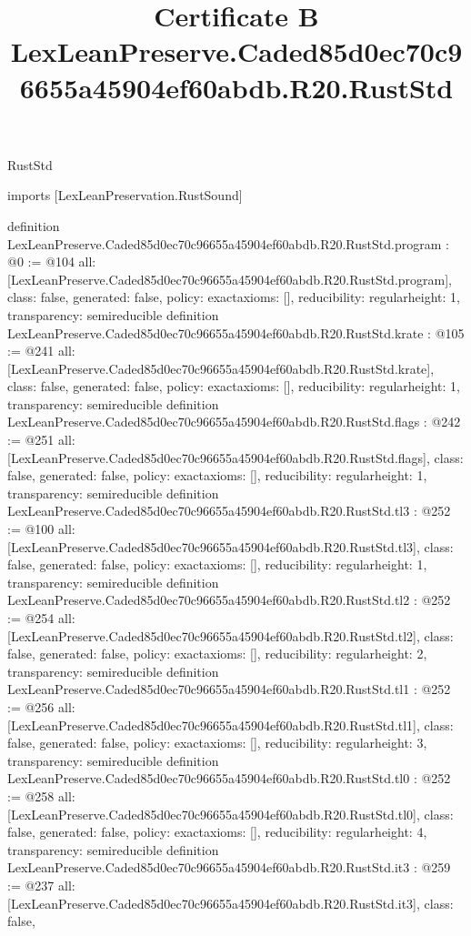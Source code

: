 \begin{lexlean}{RustStd}
\title{Certificate B LexLeanPreserve.Caded85d0ec70c96655a45904ef60abdb.R20.RustStd}
\begin{coremodule}
imports [LexLeanPreservation.RustSound]

definition LexLeanPreserve.Caded85d0ec70c96655a45904ef60abdb.R20.RustStd.program : @0 := @104 {
  all: [LexLeanPreserve.Caded85d0ec70c96655a45904ef60abdb.R20.RustStd.program],
  class: false,
  generated: false,
  policy: exact{axioms: []},
  reducibility: regular{height: 1},
  transparency: semireducible
}
definition LexLeanPreserve.Caded85d0ec70c96655a45904ef60abdb.R20.RustStd.krate : @105 := @241 {
  all: [LexLeanPreserve.Caded85d0ec70c96655a45904ef60abdb.R20.RustStd.krate],
  class: false,
  generated: false,
  policy: exact{axioms: []},
  reducibility: regular{height: 1},
  transparency: semireducible
}
definition LexLeanPreserve.Caded85d0ec70c96655a45904ef60abdb.R20.RustStd.flags : @242 := @251 {
  all: [LexLeanPreserve.Caded85d0ec70c96655a45904ef60abdb.R20.RustStd.flags],
  class: false,
  generated: false,
  policy: exact{axioms: []},
  reducibility: regular{height: 1},
  transparency: semireducible
}
definition LexLeanPreserve.Caded85d0ec70c96655a45904ef60abdb.R20.RustStd.tl3 : @252 := @100 {
  all: [LexLeanPreserve.Caded85d0ec70c96655a45904ef60abdb.R20.RustStd.tl3],
  class: false,
  generated: false,
  policy: exact{axioms: []},
  reducibility: regular{height: 1},
  transparency: semireducible
}
definition LexLeanPreserve.Caded85d0ec70c96655a45904ef60abdb.R20.RustStd.tl2 : @252 := @254 {
  all: [LexLeanPreserve.Caded85d0ec70c96655a45904ef60abdb.R20.RustStd.tl2],
  class: false,
  generated: false,
  policy: exact{axioms: []},
  reducibility: regular{height: 2},
  transparency: semireducible
}
definition LexLeanPreserve.Caded85d0ec70c96655a45904ef60abdb.R20.RustStd.tl1 : @252 := @256 {
  all: [LexLeanPreserve.Caded85d0ec70c96655a45904ef60abdb.R20.RustStd.tl1],
  class: false,
  generated: false,
  policy: exact{axioms: []},
  reducibility: regular{height: 3},
  transparency: semireducible
}
definition LexLeanPreserve.Caded85d0ec70c96655a45904ef60abdb.R20.RustStd.tl0 : @252 := @258 {
  all: [LexLeanPreserve.Caded85d0ec70c96655a45904ef60abdb.R20.RustStd.tl0],
  class: false,
  generated: false,
  policy: exact{axioms: []},
  reducibility: regular{height: 4},
  transparency: semireducible
}
definition LexLeanPreserve.Caded85d0ec70c96655a45904ef60abdb.R20.RustStd.it3 : @259 := @237 {
  all: [LexLeanPreserve.Caded85d0ec70c96655a45904ef60abdb.R20.RustStd.it3],
  class: false,
}
\end{coremodule}
\end{lexlean}
